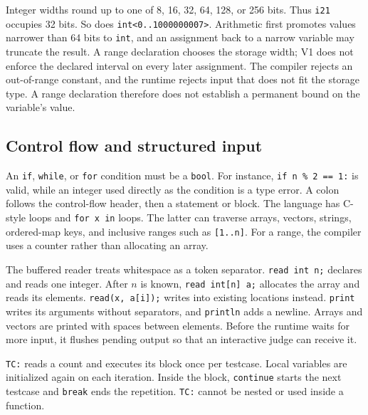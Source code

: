 \documentclass[12pt,a4paper]{report}
\begin{document}
\noindent\begin{minipage}{\linewidth}
Integer widths round up to one of 8, 16, 32, 64, 128, or 256 bits. Thus \texttt{i21} occupies 32 bits. So does \texttt{int<0..1000000007>}. Arithmetic first promotes values narrower than 64 bits to \texttt{int}, and an assignment back to a narrow variable may truncate the result. A range declaration chooses the storage width; V1 does not enforce the declared interval on every later assignment. The compiler rejects an out-of-range constant, and the runtime rejects input that does not fit the storage type. A range declaration therefore does not establish a permanent bound on the variable's value.
\end{minipage}

\subsection{Control flow and structured input}
An \texttt{if}, \texttt{while}, or \texttt{for} condition must be a \texttt{bool}. For instance, \texttt{if n \% 2 == 1:} is valid, while an integer used directly as the condition is a type error. A colon follows the control-flow header, then a statement or block. The language has C-style loops and \texttt{for x in} loops. The latter can traverse arrays, vectors, strings, ordered-map keys, and inclusive ranges such as \texttt{[1..n]}. For a range, the compiler uses a counter rather than allocating an array.

The buffered reader treats whitespace as a token separator. \texttt{read int n;} declares and reads one integer. After $n$ is known, \texttt{read int[n] a;} allocates the array and reads its elements. \texttt{read(x, a[i]);} writes into existing locations instead. \texttt{print} writes its arguments without separators, and \texttt{println} adds a newline. Arrays and vectors are printed with spaces between elements. Before the runtime waits for more input, it flushes pending output so that an interactive judge can receive it.

\texttt{TC:} reads a count and executes its block once per testcase. Local variables are initialized again on each iteration. Inside the block, \texttt{continue} starts the next testcase and \texttt{break} ends the repetition. \texttt{TC:} cannot be nested or used inside a function.
\end{document}

